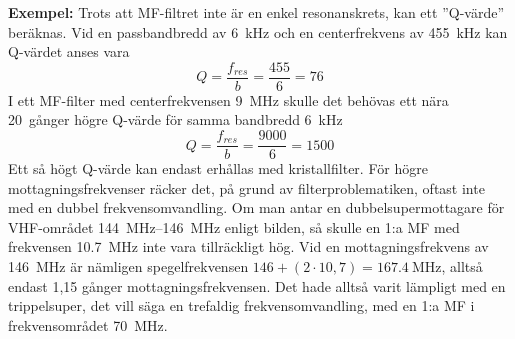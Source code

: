 \textbf{Exempel:}
Trots att MF-filtret inte är en enkel resonanskrets, kan ett ''Q-värde''
beräknas.
Vid en passbandbredd av \SI{6}{\kilo\hertz} och en centerfrekvens av
\SI{455}{\kilo\hertz} kan Q-värdet anses vara
\[ Q = \frac{f_{\textit{res}}}{b} = \frac{455}{6} = 76 \]
I ett MF-filter med centerfrekvensen \SI{9}{\mega\hertz} skulle det behövas ett
nära 20~gånger högre Q-värde för samma bandbredd \SI{6}{\kilo\hertz}
\[ Q = \frac{f_{\textit{res}}}{b} = \frac{9000}{6} = 1500 \]
Ett så högt Q-värde kan endast erhållas med kristallfilter.
För högre mottagningsfrekvenser räcker det, på grund av filterproblematiken,
oftast inte med en dubbel frekvensomvandling.
Om man antar en dubbelsupermottagare för VHF-området
\SIrange{144}{146}{\mega\hertz} enligt bilden, så skulle en 1:a MF med
frekvensen \SI{10,7}{\mega\hertz} inte vara tillräckligt hög.
Vid en mottagningsfrekvens av \SI{146}{\mega\hertz} är nämligen spegelfrekvensen
\(146 + (2 \cdot 10,7) = \SI{167,4}{\mega\hertz}\), alltså endast 1,15 gånger
mottagningsfrekvensen.
Det hade alltså varit lämpligt med en trippelsuper, det vill säga en trefaldig
frekvensomvandling, med en 1:a MF i frekvensområdet \SI{70}{\mega\hertz}.
